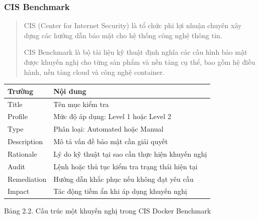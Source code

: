 \subsubsection{CIS Benchmark}\label{cis-benchmark}

\begin{quote}
CIS (Center for Internet Security) là tổ chức phi lợi nhuận chuyên xây dựng các hướng dẫn bảo mật cho hệ thống công nghệ thông tin.

CIS Benchmark là bộ tài liệu kỹ thuật định nghĩa các cấu hình bảo mật được khuyến nghị cho từng sản phẩm và nền tảng cụ thể, bao gồm hệ điều hành, nền tảng cloud và công nghệ container.
\end{quote}

{\def\LTcaptype{none}
\begin{center}
\label{tab:cap-do-cis-benchmark}
\end{center}
\begin{longtable}[]{@{}|
  >{\raggedright\arraybackslash}p{}|
  >{\raggedright\arraybackslash}p{}|@{}}
\hline
\begin{minipage}[b]{\linewidth}\raggedright
\textbf{Trường}
\end{minipage} & \begin{minipage}[b]{\linewidth}\raggedright
\textbf{Nội dung}
\end{minipage} \\
\hline
\endhead
Title & Tên mục kiểm tra \\
\hline
Profile & Mức độ áp dụng: Level 1 hoặc Level 2 \\
\hline
Type & Phân loại: Automated hoặc Manual \\
\hline
Description & Mô tả vấn đề bảo mật cần giải quyết \\
\hline
Rationale & Lý do kỹ thuật tại sao cần thực hiện khuyến nghị \\
\hline
Audit & Lệnh hoặc thủ tục kiểm tra trạng thái hiện tại \\
\hline
Remediation & Hướng dẫn khắc phục nếu không đạt yêu cầu \\
\hline
Impact & Tác động tiềm ẩn khi áp dụng khuyến nghị \\
\hline
\end{longtable}
}

Bảng 2.2. Cấu trúc một khuyến nghị trong CIS Docker Benchmark
